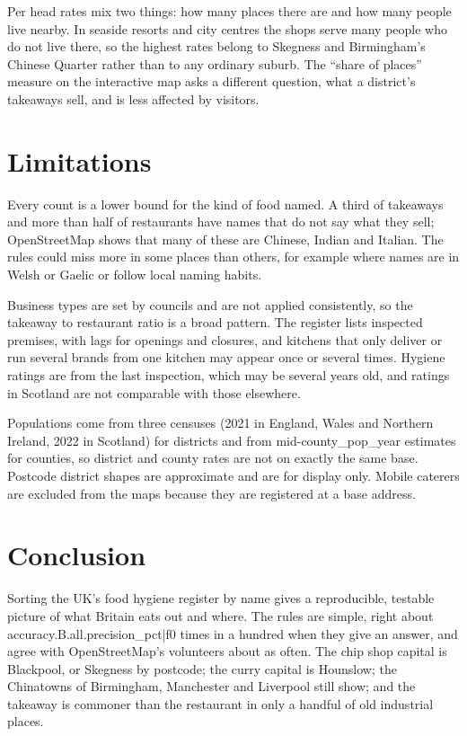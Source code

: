 \documentclass[11pt,a4paper]{article}
\begin{document}
Per head rates mix two things: how many places there are and how many people live nearby. In seaside resorts and city centres the shops serve many people who do not live there, so the highest rates belong to Skegness and Birmingham's Chinese Quarter rather than to any ordinary suburb. The ``share of places'' measure on the interactive map asks a different question, what a district's takeaways sell, and is less affected by visitors.

\section{Limitations}

Every count is a lower bound for the kind of food named. A third of takeaways and more than half of restaurants have names that do not say what they sell; OpenStreetMap shows that many of these are Chinese, Indian and Italian. The rules could miss more in some places than others, for example where names are in Welsh or Gaelic or follow local naming habits.

Business types are set by councils and are not applied consistently, so the takeaway to restaurant ratio is a broad pattern. The register lists inspected premises, with lags for openings and closures, and kitchens that only deliver or run several brands from one kitchen may appear once or several times. Hygiene ratings are from the last inspection, which may be several years old, and ratings in Scotland are not comparable with those elsewhere.

Populations come from three censuses (2021 in England, Wales and Northern Ireland, 2022 in Scotland) for districts and from mid-{{county_pop_year}} estimates for counties, so district and county rates are not on exactly the same base. Postcode district shapes are approximate and are for display only. Mobile caterers are excluded from the maps because they are registered at a base address.

\section{Conclusion}

Sorting the UK's food hygiene register by name gives a reproducible, testable picture of what Britain eats out and where. The rules are simple, right about {{accuracy.B.all.precision_pct|f0}} times in a hundred when they give an answer, and agree with OpenStreetMap's volunteers about as often. The chip shop capital is Blackpool, or Skegness by postcode; the curry capital is Hounslow; the Chinatowns of Birmingham, Manchester and Liverpool still show; and the takeaway is commoner than the restaurant in only a handful of old industrial places.
\end{document}
